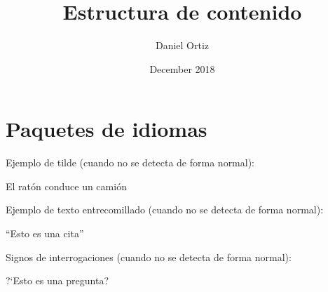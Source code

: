 \documentclass{article}
\title{Estructura de contenido}
\author{Daniel Ortiz}
\date{December 2018}
\begin{document}
\maketitle
\newpage
\section{Paquetes de idiomas}
Ejemplo de tilde (cuando no se detecta de forma normal):
\begin{center}
    El rat\'on conduce un camión
\end{center}
Ejemplo de texto entrecomillado (cuando no se detecta de forma normal):
\begin{center}
     ``Esto es una cita''
\end{center}
Signos de interrogaciones (cuando no se detecta de forma normal):
\begin{center}
     ?`Esto es una pregunta?
\end{center}
\end{document}
